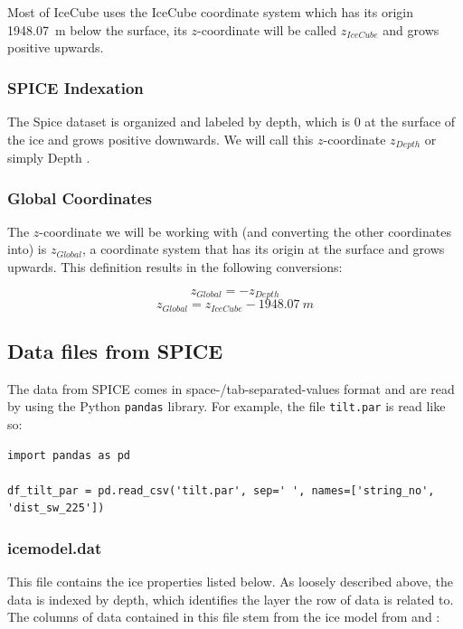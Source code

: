 \documentclass[a4paper,10pt]{scrartcl}
\begin{document}
Most of IceCube uses the IceCube coordinate system which has its origin \SI{1948.07}{m} below the surface, its $z$-coordinate will be called $z_{IceCube}$ and grows positive upwards.

\subsubsection*{SPICE Indexation}

The Spice dataset is organized and labeled by depth, which is 0 at the surface of the ice and grows positive downwards.
We will call this $z$-coordinate $z_{Depth}$ or simply Depth \cite{1301.5361}.

\subsubsection*{Global Coordinates}

The $z$-coordinate we will be working with (and converting the other coordinates into) is $z_{Global}$, a coordinate system that has its origin at the surface and grows upwards.
This definition results in the following conversions:

\begin{equation}
    z_{Global} = -z_{Depth}
\end{equation}
\begin{equation}
    z_{Global} = z_{IceCube} - \SI{1948.07}{m}
\end{equation}

\subsection{Data files from SPICE}
\label{files}

The data from SPICE comes in space-/tab-separated-values format and are read by using the Python \texttt{pandas} library.
For example, the file \texttt{tilt.par} is read like so:

\begin{verbatim}
import pandas as pd

df_tilt_par = pd.read_csv('tilt.par', sep=' ', names=['string_no', 'dist_sw_225'])
\end{verbatim}

\subsubsection*{icemodel.dat}

This file contains the ice properties listed below.
As loosely described above, the data is indexed by depth, which identifies the layer the row of data is related to.
The columns of data contained in this file stem from the ice model from \cite{1301.5361} and \cite{icemodel}:
\end{document}
